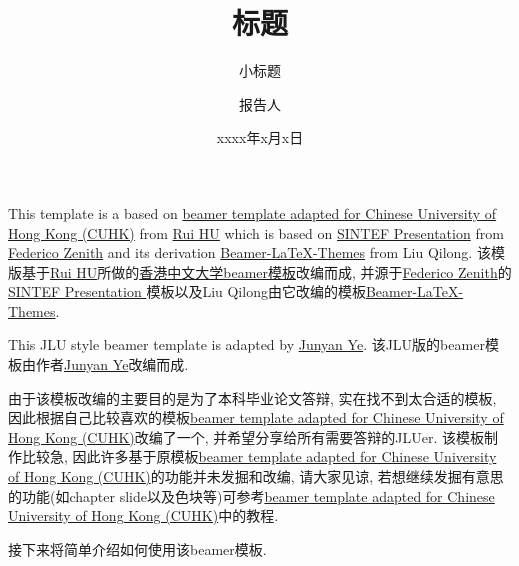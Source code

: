 \documentclass{beamer}
\title{标题}
\subtitle{小标题}
\author{报告人}
\date{xxxx年x月x日}
\newcommand{\hrefcol}[2]{\textcolor{cyan}{\href{#1}{#2}}}
\theoremstyle{definition} \newtheorem{thm}{定理}[section]
\theoremstyle{definition} \newtheorem{lem}[thm]{引理}
\theoremstyle{definition} \newtheorem{prop}[thm]{命题}
\theoremstyle{definition} \newtheorem{coro}{推论}[thm]
\theoremstyle{definition} \newtheorem{df}[thm]{定义}
\begin{document}
\maketitle

\onehalfspacing
\setlength{\parindent}{2em}

\allowdisplaybreaks[4]

\begin{frame}

This template is a based on \hrefcol{https://www.overleaf.com/latex/templates/xiang-gang-zhong-wen-da-xue-zhong-wen-mo-ban-cuhk-beamer-template/bpgghjpjkqxw}{beamer template adapted for Chinese University of Hong Kong (CUHK)} from \hrefcol{https://richardfury.github.io/}{Rui HU} which is based on \hrefcol{https://www.overleaf.com/latex/templates/sintef-presentation/jhbhdffczpnx}{SINTEF Presentation} from \hrefcol{mailto:federico.zenith@sintef.no}{Federico Zenith} and its derivation \hrefcol{https://github.com/TOB-KNPOB/Beamer-LaTeX-Themes}{Beamer-LaTeX-Themes} from Liu Qilong.  该模版基于\hrefcol{https://richardfury.github.io/}{Rui HU}所做的\hrefcol{https://www.overleaf.com/latex/templates/xiang-gang-zhong-wen-da-xue-zhong-wen-mo-ban-cuhk-beamer-template/bpgghjpjkqxw}{香港中文大学beamer模板}改编而成, 并源于\hrefcol{mailto:federico.zenith@sintef.no}{Federico Zenith}的\hrefcol{https://www.overleaf.com/latex/templates/sintef-presentation/jhbhdffczpnx}{SINTEF Presentation }模板以及Liu Qilong由它改编的模板\hrefcol{https://github.com/TOB-KNPOB/Beamer-LaTeX-Themes}{Beamer-LaTeX-Themes}.

\vspace{\baselineskip}
This JLU style beamer template is adapted by \hrefcol{https://GEOR-TS.github.io/}{Junyan Ye}. 该JLU版的beamer模板由作者\hrefcol{https://GEOR-TS.github.io/}{Junyan Ye}改编而成.

\vspace{\baselineskip}

由于该模板改编的主要目的是为了本科毕业论文答辩, 实在找不到太合适的模板, 因此根据自己比较喜欢的模板\hrefcol{https://www.overleaf.com/latex/templates/xiang-gang-zhong-wen-da-xue-zhong-wen-mo-ban-cuhk-beamer-template/bpgghjpjkqxw}{beamer template adapted for Chinese University of Hong Kong (CUHK)}改编了一个, 并希望分享给所有需要答辩的JLUer. 该模板制作比较急, 因此许多基于原模板\hrefcol{https://www.overleaf.com/latex/templates/xiang-gang-zhong-wen-da-xue-zhong-wen-mo-ban-cuhk-beamer-template/bpgghjpjkqxw}{beamer template adapted for Chinese University of Hong Kong (CUHK)}的功能并未发掘和改编, 请大家见谅, 若想继续发掘有意思的功能(如chapter slide以及色块等)可参考\hrefcol{https://www.overleaf.com/latex/templates/xiang-gang-zhong-wen-da-xue-zhong-wen-mo-ban-cuhk-beamer-template/bpgghjpjkqxw}{beamer template adapted for Chinese University of Hong Kong (CUHK)}中的教程.

接下来将简单介绍如何使用该beamer模板.


\end{frame}
\end{document}
